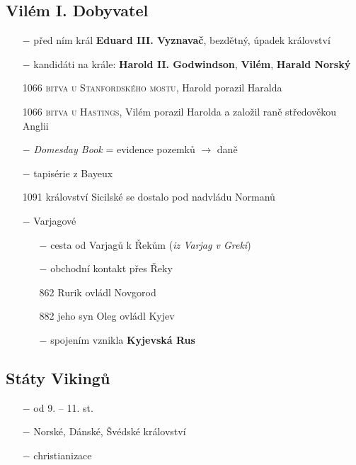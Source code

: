 \documentclass{article}
\begin{document}
\subsection*{Vilém I. Dobyvatel}
\begin{itemize}
    \vspace{-0.5em}
    \setlength\itemsep{0.15em}
    \item[$-$] před ním král \textbf{Eduard III. Vyznavač}, bezdětný, úpadek království
    \item[$-$] kandidáti na krále: \textbf{Harold II. Godwindson}, \textbf{Vilém}, \textbf{Harald Norský}
    \item[1066] \textsc{bitva u Stanfordského mostu}, Harold porazil Haralda
    \item[1066] \textsc{bitva u Hastings}, Vilém porazil Harolda a založil raně středověkou Anglii
    \item[$-$] \textit{Domesday Book} = evidence pozemků $\rightarrow$ daně
    \item[$-$] tapisérie z Bayeux
\end{itemize}
\hline
\begin{itemize}
    \vspace{-0.5em}
    \setlength\itemsep{0.15em}
    \item[1091] království Sicilské se dostalo pod nadvládu Normanů
    \item[$-$] Varjagové
    \begin{itemize}
        \vspace{-0.5em}
        \setlength\itemsep{0.15em}
        \item[$-$] cesta od Varjagů k Řekům (\textit{iz Varjag v Greki})
        \item[$-$] obchodní kontakt přes Řeky
        \item[862] Rurik ovládl Novgorod
        \item[882] jeho syn Oleg ovládl Kyjev
        \item[$-$] spojením vznikla \textbf{Kyjevská Rus}
    \end{itemize}
\end{itemize}

\subsection*{Státy Vikingů}
\begin{itemize}
    \vspace{-0.5em}
    \setlength\itemsep{0.15em}
    \item[$-$] od 9. -- 11. st.
    \item[$-$] Norské, Dánské, Švédské království
    \item[$-$] christianizace
\end{itemize}
\end{document}

